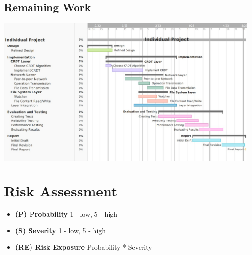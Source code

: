 \documentclass[12pt]{report}
\begin{document}
\subsection{Remaining Work}
\begin{center}
    \includegraphics[width=16cm]{images/remaining.jpg}
\end{center} 


\section{Risk Assessment}

\begin{itemize}
    \item \textbf{(P) Probability} 1 - low, 5 - high
    \item \textbf{(S) Severity}  1 - low, 5 - high
    \item \textbf{(RE) Risk Exposure} Probability * Severity
\end{itemize}
\end{document}
